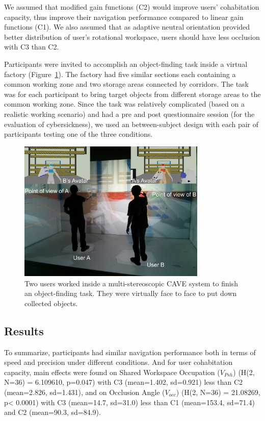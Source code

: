 We assumed that modified gain functions (C2) would improve users' cohabitation capacity, thus improve their navigation performance compared to linear gain functions (C1). We also assumed that as adaptive neutral orientation provided better distribution of user's rotational workspace, users should have less occlusion with C3 than C2.

Participants were invited to accomplish an object-finding task inside a virtual factory (Figure~\ref{fig:4_teaser_exp1}). The factory had five similar sections each containing a common working zone and two storage areas connected by corridors. The task was for each participant to bring target objects from different storage areas to the common working zone. Since the task was relatively complicated (based on a realistic working scenario) and had a pre and post questionnaire session (for the evaluation of cybersickness), we used an between-subject design with each pair of participants testing one of the three conditions.

\begin{figure}[tb]
  \centering
  \includegraphics[width=0.8\textwidth]{figures/ch4/teaser_exp1}
  \caption{\label{fig:4_teaser_exp1}Two users worked inside a multi-stereoscopic CAVE system to finish an object-finding task. They were virtually face to face to put down collected objects.}
\end{figure}

\subsection{Results}
To summarize, participants had similar navigation performance both in terms of speed and precision under different conditions. And for user cohabitation capacity, main effects were found on Shared Workspace Occupation ($V_{Psh}$) (H(2, N=36) = 6.109610, p=0.047) with C3 (mean=1.402, sd=0.921) less than C2 (mean=2.826, sd=1.431), and on Occlusion Angle ($V_{occ}$) (H(2, N=36) = 21.08269, p\textless{} 0.0001) with C3 (mean=14.7, sd=31.0) less than C1 (mean=153.4, sd=71.4) and C2 (mean=90.3, sd=84.9).

